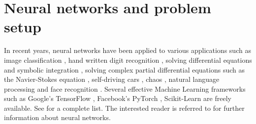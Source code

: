 \documentclass[12pt]{article}
\begin{document}
\section{Neural networks and problem setup}
In recent years, neural networks have been applied to various applications such as image classification \cite{paper:hinton2017}, hand written digit recognition \cite{paper:kulkarni2018}, solving differential equations and symbolic integration \cite{misc:lample2019}, solving complex partial differential equations such as the Navier-Stokes equation \cite{misc:anandkumar2020}, self-driving cars \cite{misc:agnihotri2019,misc:nvidiaselfdriving2016}, chaos \cite{paper:pathak2018}, natural language processing \cite{misc:googlenlp} and face recognition \cite{conf:taigman2014}. Several effective Machine Learning frameworks such as Google's TensorFlow \cite{misc:tensorflow}, Facebook's PyTorch \cite{incollect:pytorch}, Scikit-Learn \cite{paper:scikit-learn} are freely available. See \cite{misc:compdeep} for a complete list. The interested reader is referred to \cite{book:aggarwal,book:goodfellow,book:chollet,misc:cs231n,misc:andrewng,misc:udemy} for further information about neural networks.
\end{document}
